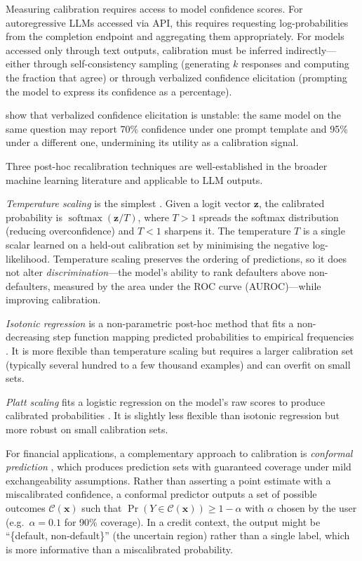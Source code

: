 Measuring calibration requires access to model confidence scores. For autoregressive
LLMs accessed via API, this requires requesting log-probabilities from the completion
endpoint and aggregating them appropriately. For models accessed only through text
outputs, calibration must be inferred indirectly---either through self-consistency
sampling (generating $k$ responses and computing the fraction that agree) or through
verbalized confidence elicitation (prompting the model to express its confidence as a
percentage).

\citet{wang2023survey} show that verbalized confidence elicitation is unstable:
the same model on the same question may report 70\% confidence under one prompt
template and 95\% under a different one, undermining its utility as a calibration signal.

Three post-hoc recalibration techniques are well-established in the broader machine
learning literature and applicable to LLM outputs.

\emph{Temperature scaling} is the simplest \cite{guo2017calibration}. Given a logit
vector $\mathbf{z}$, the calibrated probability is $\operatorname{softmax}(\mathbf{z}/T)$, where $T > 1$
spreads the softmax distribution (reducing overconfidence) and $T < 1$ sharpens it.
The temperature $T$ is a single scalar learned on a held-out calibration set by
minimising the negative log-likelihood. Temperature scaling preserves the ordering of
predictions, so it does not alter \emph{discrimination}---the model's ability to rank
defaulters above non-defaulters, measured by the area under the ROC curve
(AUROC)---while improving calibration.

\emph{Isotonic regression} is a non-parametric post-hoc method that fits a
non-decreasing step function mapping predicted probabilities to empirical frequencies
\cite{zadrozny2002transforming}. It is more flexible than temperature scaling but
requires a larger calibration set (typically several hundred to a few thousand
examples) and can overfit on small sets.

\emph{Platt scaling} fits a logistic regression on the model's raw scores to produce
calibrated probabilities \cite{platt1999probabilistic}. It is slightly less flexible
than isotonic regression but more robust on small calibration sets.

For financial applications, a complementary approach to calibration is
\emph{conformal prediction} \cite{angelopoulos2022gentle}, which produces prediction
sets with guaranteed coverage under mild exchangeability assumptions. Rather than
asserting a point estimate with a miscalibrated confidence, a conformal predictor
outputs a set of possible outcomes $\mathcal{C}(\mathbf{x})$ such that
$\Pr(Y \in \mathcal{C}(\mathbf{x})) \geq 1-\alpha$ with $\alpha$ chosen by the user
(e.g.\ $\alpha = 0.1$ for 90\% coverage). In a credit context, the output might be
``\{default, non-default\}'' (the uncertain region) rather than a single label, which
is more informative than a miscalibrated probability.

